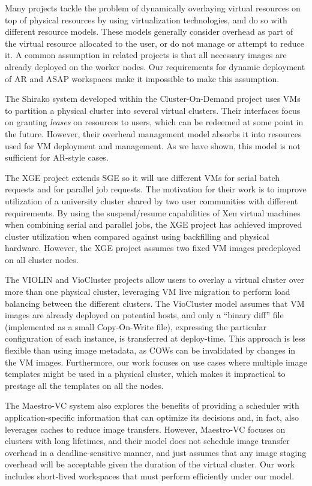 Many projects tackle the problem of dynamically overlaying virtual
resources on top of physical resources by using virtualization
technologies, and do so with different resource models. These models
generally consider overhead as part of the virtual resource allocated
to the user, or do not manage or attempt to reduce it. A common
assumption in related projects is that all necessary images are already
deployed on the worker nodes. Our requirements for dynamic deployment
of AR and ASAP workspaces make it impossible to make this assumption.

The Shirako system \cite{BorjaCite12} developed within the Cluster{}-On{}-Demand
project \cite{BorjaCite10, codweb} uses VMs to partition a physical cluster into several
virtual clusters. Their interfaces focus on granting \emph{leases} on
resources to users, which can be redeemed at some point in the future.
However, their overhead
management model absorbs it into resources used for VM deployment
and management. As we have shown, this model is not sufficient for
AR{}-style cases.

The XGE project \cite{xge} extends SGE so it will use different VMs for serial batch requests and for parallel job requests. The motivation for their work is to improve utilization of a university cluster shared by two user communities with different requirements. By using the suspend/resume capabilities of Xen virtual machines when combining serial and parallel jobs, the XGE project has achieved improved cluster utilization when compared against using backfilling and physical hardware. However, the XGE project assumes two fixed VM images predeployed on all cluster nodes.


The VIOLIN and VioCluster projects \cite{BorjaCite13, viocluster, DBLP:journals/computer/RuthJXG05} allow users to overlay a
virtual cluster over more than one physical cluster, leveraging VM live
migration to perform load balancing between the different clusters. The
VioCluster model assumes that VM images are already deployed on
potential hosts, and only a ``binary diff'' file (implemented as a
small Copy{}-On{}-Write file), expressing the particular configuration
of each instance, is transferred at deploy{}-time. This approach is less
flexible than using image metadata, as COWs can be invalidated by
changes in the VM images. Furthermore, our work focuses on use cases
where multiple image templates might be used in a physical cluster,
which makes it impractical to prestage all the templates on all the
nodes.

The Maestro{}-VC system \cite{BorjaCite18} also explores the benefits of providing a
scheduler with application{}-specific information that can optimize its
decisions and, in fact, also leverages caches to reduce image
transfers. However, Maestro{}-VC focuses on clusters with long
lifetimes, and their model does not schedule image transfer overhead in
a deadline{}-sensitive manner, and just assumes that any image staging
overhead will be acceptable given the duration of the virtual cluster.
Our work includes short{}-lived workspaces that must perform
efficiently under our model.

